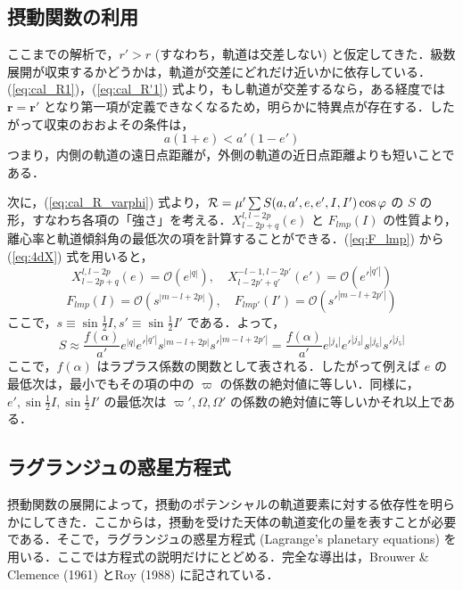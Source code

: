 \documentclass[11pt,a4paper,oneside,onecolumn]{jreport}
\begin{document}
\subsection{摂動関数の利用}
ここまでの解析で，$r' > r$ (すなわち，軌道は交差しない) と仮定してきた．級数展開が収束するかどうかは，軌道が交差にどれだけ近いかに依存している．(\ref{eq:cal_R1})，(\ref{eq:cal_R'1}) 式より，もし軌道が交差するなら，ある経度では${\bm r} = {\bm r'}$ となり第一項が定義できなくなるため，明らかに特異点が存在する．したがって収束のおおよその条件は，
\begin{equation}
a (1 + e) < a' (1 - e')
\end{equation}
つまり，内側の軌道の遠日点距離が，外側の軌道の近日点距離よりも短いことである．

次に，(\ref{eq:cal_R_varphi}) 式より，${\cal R} = \mu' \sum S (a,a',e,e',I,I') \cos \varphi$ の $S$ の形，すなわち各項の「強さ」を考える．$X_{l - 2p + q}^{l, l - 2p} (e)$ と $F_{lmp} (I)$ の性質より，離心率と軌道傾斜角の最低次の項を計算することができる．(\ref{eq:F_lmp}) から (\ref{eq:4dX}) 式を用いると，
\begin{equation}
X_{l - 2p + q}^{l, l - 2p} (e) = \mathcal{O} (e^{|q|}), \quad X_{l - 2p' + q'}^{-l -1, l - 2p'} (e') = \mathcal{O} (e'^{|q'|})
\end{equation}
\begin{equation}
F_{lmp} (I) = \mathcal{O} (s^{|m - l + 2p|}), \quad F_{lmp'} (I') = \mathcal{O} (s'^{|m - l + 2p'|})
\end{equation}
ここで，$s \equiv \sin \frac{1}{2} I, s' \equiv \sin \frac{1}{2} I'$ である．よって，
\begin{equation}
S \approx \frac{f (\alpha)}{a'} e^{|q|} e'^{|q'|} s^{|m - l + 2p|} s'^{|m - l + 2p'|} = \frac{f (\alpha)}{a'} e^{|j_4|} e'^{|j_3|} s^{|j_6|} s'^{|j_5|} \label{eq:S}
\end{equation}
ここで，$f (\alpha)$ はラプラス係数の関数として表される．したがって例えば $e$ の最低次は，最小でもその項の中の $\varpi$ の係数の絶対値に等しい．同様に，$e', \sin \frac{1}{2} I, \sin \frac{1}{2} I'$ の最低次は $\varpi', \Omega, \Omega'$ の係数の絶対値に等しいかそれ以上である．

\subsection{ラグランジュの惑星方程式}
摂動関数の展開によって，摂動のポテンシャルの軌道要素に対する依存性を明らかにしてきた．ここからは，摂動を受けた天体の軌道変化の量を表すことが必要である．そこで，ラグランジュの惑星方程式 (Lagrange's planetary equations) を用いる．ここでは方程式の説明だけにとどめる．完全な導出は，Brouwer \& Clemence (1961) とRoy (1988) に記されている．
\end{document}
